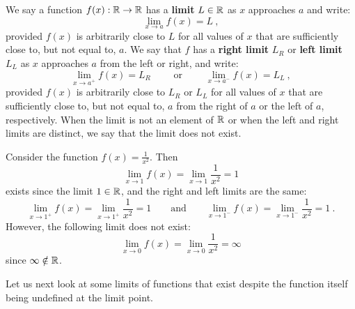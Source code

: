 \begin{definition}\label{D:LimitofRealFunction}
We say a function $f(x):\mathbb{R} \to \mathbb{R}$ has a {\bf limit} $L \in \mathbb{R}$ as $x$ approaches $a$ and write:
\[
\lim_{x \to a} f(x)=L \ ,
\]
provided $f(x)$ is arbitrarily close to $L$ for all values of $x$ that are sufficiently close to, but not equal to, $a$.  We say that $f$ has a {\bf right limit} $L_R$ or {\bf left limit} $L_L$ as $x$ approaches $a$ from the left or right, and write:
\[
\lim_{x \to a^+} f(x)=L_R  \qquad \text{ or } \qquad \lim_{x \to a^-} f(x)=L_L \ ,
\] 
provided $f(x)$ is arbitrarily close to $L_R$ or $L_L$ for all values of $x$ that are sufficiently close to, but not equal to, $a$ from the right of $a$ or the left of $a$, respectively.  When the limit is not an element of $\mathbb{R}$ or when the left and right limits are distinct, we say that the limit does not exist. 
\end{definition}

\begin{example}[Limit of $1/x^2$]
Consider the function $f(x)=\frac{1}{x^2}$.  Then
\[
\lim_{x \to 1} f(x) = \lim_{x \to 1} \frac{1}{x^2} = 1
\]
exists since the limit $1 \in \mathbb{R}$, and the right and left limits are the same:
\[
\lim_{x \to 1^+} f(x) = \lim_{x \to 1^+} \frac{1}{x^2} = 1 \qquad \text{and} \qquad 
\lim_{x \to 1^-} f(x) = \lim_{x \to 1^-} \frac{1}{x^2} = 1 \ .
\]
However, the following limit does not exist:
\[
\lim_{x \to 0} f(x) = \lim_{x \to 0} \frac{1}{x^2} = \infty
\]
since $\infty \notin \mathbb{R}$.
\end{example}

Let us next look at some limits of functions that exist despite the function itself being undefined at the limit point.  

